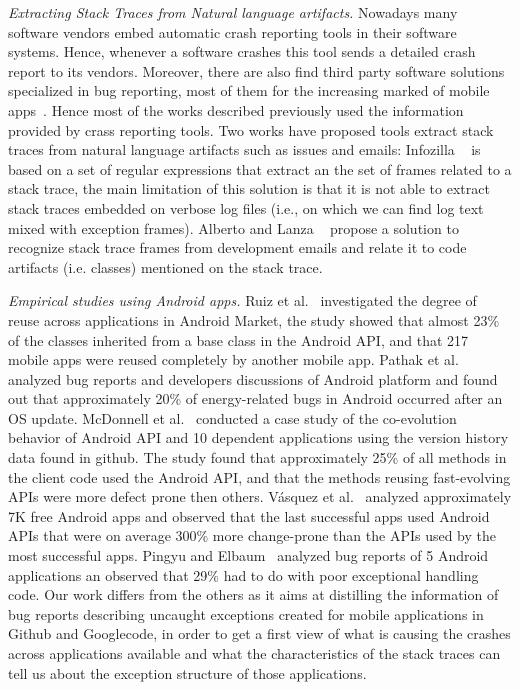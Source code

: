 \documentclass[conference]{IEEEtran}
\begin{document}
\textit{Extracting Stack Traces from Natural language artifacts.} Nowadays many
software vendors embed automatic crash reporting tools in their software
systems. Hence, whenever a software crashes this tool sends a detailed crash
report to its vendors. Moreover, there are also find third party software
solutions specialized in bug reporting, most of them for the increasing marked
of mobile apps~\cite{BugSe14,BugSn14,Googl14,Acra14}. Hence most of the works
described previously used the  information provided by crass reporting tools.
Two works have proposed tools extract stack traces from natural language
artifacts such as issues and emails: Infozilla ~\cite{bettenburg2008extracting}
is based on a set of regular expressions that extract an the set of frames
related to a stack trace, the main limitation of this solution is that it is not
able to extract stack traces embedded on verbose log files (i.e., on which we
can find log text mixed with exception frames). Alberto and Lanza
~\cite{bacchelli2012content}  propose a solution to recognize stack trace frames
from development emails and relate it to code artifacts (i.e. classes) mentioned
on the stack trace.

\textit{Empirical studies using Android apps.} Ruiz et al.~\cite{Ruiz12}
investigated the degree of reuse across applications in Android Market, the
study showed that almost 23\% of the classes inherited from a base class in the
Android API, and that 217 mobile apps were reused completely by another mobile
app. Pathak et al.~\cite{Patha11} analyzed bug reports and developers
discussions of Android platform and found out that approximately 20\% of
energy-related bugs in Android occurred after an OS update. McDonnell et
al.~\cite{McDon13} conducted a case study of the co-evolution behavior of
Android API and 10 dependent applications using the version history data found
in github. The study found that approximately 25\% of all methods in the client
code used the Android API, and that the methods reusing fast-evolving APIs were
more defect prone then others. Vásquez et al.~\cite{Linar13} analyzed
approximately 7K free Android apps and observed that the last successful apps
used Android APIs that were on average 300\% more change-prone than the APIs
used by the most successful apps. Pingyu and Elbaum~\cite{Zhang12} analyzed bug
reports of 5 Android applications an observed that 29\% had to do with poor
exceptional handling code.  Our work differs from the others as it aims at
distilling the information of bug reports describing uncaught exceptions created
for mobile applications in Github and Googlecode, in order to get a first view
of what is causing the crashes across applications available and what the
characteristics of the stack traces can tell us about the exception structure of
those applications. %
\end{document}
